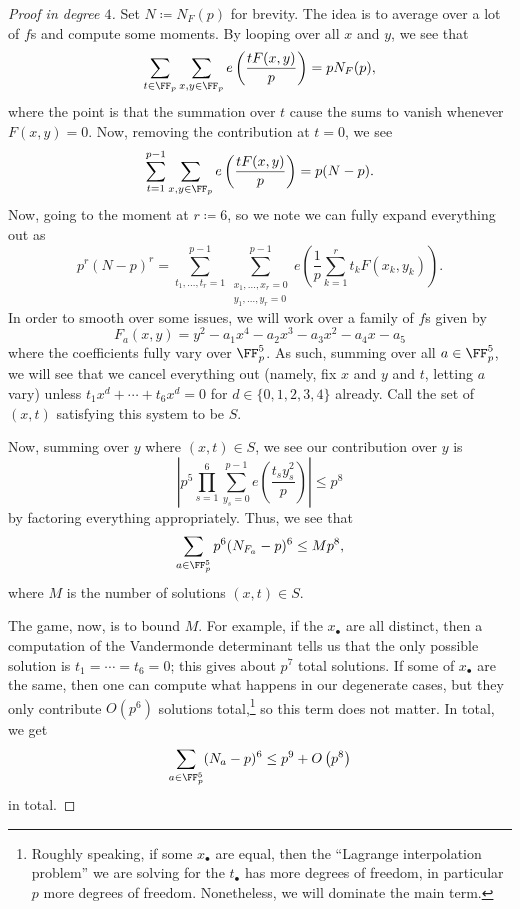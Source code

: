 \documentclass[../notes.tex]{subfiles}
\begin{document}
\begin{proof}[Proof in degree $4$]
	Set $N\coloneqq N_F(p)$ for brevity. The idea is to average over a lot of $f$s and compute some moments. By looping over all $x$ and $y$, we see that
	\[\sum_{t\in\FF_p}\sum_{x,y\in\FF_p}e\left(\frac{tF(x,y)}p\right)=pN_F(p),\]
	where the point is that the summation over $t$ cause the sums to vanish whenever $F(x,y)=0$. Now, removing the contribution at $t=0$, we see
	\[\sum_{t=1}^{p-1}\sum_{x,y\in\FF_p}e\left(\frac{tF(x,y)}p\right)=p(N-p).\]
	Now, going to the moment at $r\coloneqq6$, so we note we can fully expand everything out as
	\[p^r(N-p)^r=\sum_{t_1,\ldots,t_r=1}^{p-1}\sum_{\substack{x_1,\ldots,x_r=0\\y_1,\ldots,y_r=0}}^{p-1}e\left(\frac1p\sum_{k=1}^rt_kF(x_k,y_k)\right).\]
	In order to smooth over some issues, we will work over a family of $f$s given by
	\[F_a(x,y)=y^2-a_1x^4-a_2x^3-a_3x^2-a_4x-a_5\]
	where the coefficients fully vary over $\FF_p^5$. As such, summing over all $a\in\FF_p^5$, we will see that we cancel everything out (namely, fix $x$ and $y$ and $t$, letting $a$ vary) unless $t_1x^d+\cdots+t_6x^d=0$ for $d\in\{0,1,2,3,4\}$ already. Call the set of $(x,t)$ satisfying this system to be $S$.
	
	Now, summing over $y$ where $(x,t)\in S$, we see our contribution over $y$ is
	\[\left|p^5\prod_{s=1}^6\sum_{y_s=0}^{p-1}e\left(\frac{t_sy_s^2}p\right)\right|\le p^8\]
	by factoring everything appropriately. Thus, we see that
	\[\sum_{a\in\FF_p^5}p^6(N_{F_a}-p)^6\le Mp^8,\]
	where $M$ is the number of solutions $(x,t)\in S$.

	The game, now, is to bound $M$. For example, if the $x_\bullet$ are all distinct, then a computation of the Vandermonde determinant tells us that the only possible solution is $t_1=\cdots=t_6=0$; this gives about $p^7$ total solutions. If some of $x_\bullet$ are the same, then one can compute what happens in our degenerate cases, but they only contribute $O\left(p^6\right)$ solutions total,\footnote{Roughly speaking, if some $x_\bullet$ are equal, then the ``Lagrange interpolation problem'' we are solving for the $t_\bullet$ has more degrees of freedom, in particular $p$ more degrees of freedom. Nonetheless, we will dominate the main term.} so this term does not matter. In total, we get
	\[\sum_{a\in\FF_p^5}(N_a-p)^6\le p^9+O\left(p^8\right)\]
	in total.


\end{proof}
\end{document}
